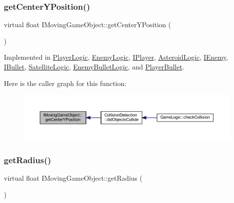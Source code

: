 \subsubsection{\texorpdfstring{get\+Center\+Y\+Position()}{getCenterYPosition()}}
{\footnotesize\ttfamily virtual float I\+Moving\+Game\+Object\+::get\+Center\+Y\+Position (\begin{DoxyParamCaption}{ }\end{DoxyParamCaption})\hspace{0.3cm}{\ttfamily [pure virtual]}}



Implemented in \hyperlink{class_player_logic_ad7b9048aee0c7b58443055f37f871537}{Player\+Logic}, \hyperlink{class_enemy_logic_a8eb47a87a47288783e0c8963c39d24e4}{Enemy\+Logic}, \hyperlink{class_i_player_a6c5a2ec396245f91bee3e00ab089d57e}{I\+Player}, \hyperlink{class_asteroid_logic_a00c9cda893b9dee7e2225377dd54a2eb}{Asteroid\+Logic}, \hyperlink{class_i_enemy_ac9a2d69103fa86d8344aa368fb33c714}{I\+Enemy}, \hyperlink{class_i_bullet_a8245ed2bc72beed1d69547ce5f87a021}{I\+Bullet}, \hyperlink{class_satellite_logic_a416fb2cabc7fcc003cbe04da68dac7c3}{Satellite\+Logic}, \hyperlink{class_enemy_bullet_logic_a4c006085f2a11f68e8043bca67d3effe}{Enemy\+Bullet\+Logic}, and \hyperlink{class_player_bullet_a7ad2bc922595b9a11373fd42666926ef}{Player\+Bullet}.

Here is the caller graph for this function\+:
\nopagebreak
\begin{figure}[H]
\begin{center}
\leavevmode
\includegraphics[width=350pt]{class_i_moving_game_object_a075f69d69fd38dc02a0ec3c7b1cb0534_icgraph}
\end{center}
\end{figure}
\mbox{\label{class_i_moving_game_object_ab2120f126d088beda46654aa3ccfd705}} 
\subsubsection{\texorpdfstring{get\+Radius()}{getRadius()}}
{\footnotesize\ttfamily virtual float I\+Moving\+Game\+Object\+::get\+Radius (\begin{DoxyParamCaption}{ }\end{DoxyParamCaption})\hspace{0.3cm}{\ttfamily [pure virtual]}}



